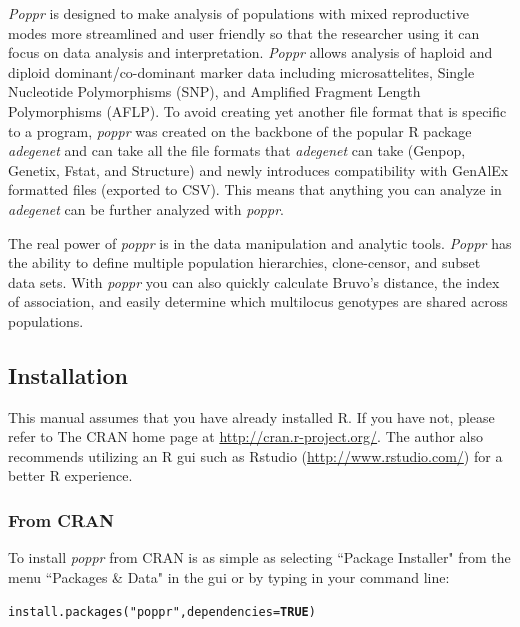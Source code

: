 \documentclass[letterpaper]{article}\usepackage[]{graphicx}\usepackage[]{color}
\makeatletter
\newcommand{\hlnum}[1]{\textcolor[rgb]{0.502,0,0.502}{\textbf{#1}}}%
\newcommand{\hlstr}[1]{\textcolor[rgb]{0.651,0.522,0}{#1}}%
\newcommand{\hlstd}[1]{\textcolor[rgb]{0,0,0}{#1}}%
\newcommand{\hlkwc}[1]{\textcolor[rgb]{0,0.502,0.753}{#1}}%
\newcommand{\hlkwd}[1]{\textcolor[rgb]{0,0.267,0.4}{#1}}%
\newenvironment{kframe}{%
 \def\at@end@of@kframe{}%
 \ifinner\ifhmode%
  \def\at@end@of@kframe{\end{minipage}}%
  \begin{minipage}{\columnwidth}%
 \fi\fi%
 \def\FrameCommand##1{\hskip\@totalleftmargin \hskip-\fboxsep
 \colorbox{shadecolor}{##1}\hskip-\fboxsep
     \hskip-\linewidth \hskip-\@totalleftmargin \hskip\columnwidth}%
 \MakeFramed {\advance\hsize-\width
   \@totalleftmargin\z@ \linewidth\hsize
   \@setminipage}}%
 {\par\unskip\endMakeFramed%
 \at@end@of@kframe}
\newenvironment{knitrout}{}{} %
\newcommand{\tab}{\hspace*{1em}}
\makeatother
\begin{document}
\textit{Poppr} is designed to make analysis of populations with mixed reproductive modes more streamlined and user friendly so that the researcher using it can focus on data analysis and interpretation. \textit{Poppr} allows analysis of haploid and diploid dominant/co-dominant marker data including microsattelites, Single Nucleotide Polymorphisms (SNP), and Amplified Fragment Length Polymorphisms (AFLP). To avoid creating yet another file format that is specific to a program, \textit{poppr} was created on the backbone of the popular R package \textit{adegenet} and can take all the file formats that \textit{adegenet} can take (Genpop, Genetix, Fstat, and Structure) and newly introduces compatibility with GenAlEx formatted files (exported to CSV). This means that anything you can analyze in \textit{adegenet} can be further analyzed with \textit{poppr}.

The real power of \textit{poppr} is in the data manipulation and analytic tools. \textit{Poppr} has the ability to define multiple population hierarchies, clone-censor, and subset data sets. With \textit{poppr} you can also quickly calculate Bruvo's distance, the index of association, and easily determine which multilocus genotypes are shared across populations.
\subsection{Installation}\label{intro:install}

\tab\tab This manual assumes that you have already installed R. If you have not, please refer to The CRAN home page at \url{http://cran.r-project.org/}. The author also recommends utilizing an R gui such as Rstudio (\url{http://www.rstudio.com/}) for a better R experience. 

\subsubsection{From CRAN}
\tab\tab To install \textit{poppr} from CRAN is as simple as selecting ``Package Installer" from the menu ``Packages \& Data" in the gui or by typing in your command line:
\begin{knitrout}\footnotesize
{}\color{fgcolor}\begin{kframe}
\begin{alltt}
\hlkwd{install.packages}\hlstd{(}\hlstr{"poppr"}\hlstd{,} \hlkwc{dependencies} \hlstd{=} \hlnum{TRUE}\hlstd{)}
\end{alltt}
\end{kframe}
\end{knitrout}
\end{document}
